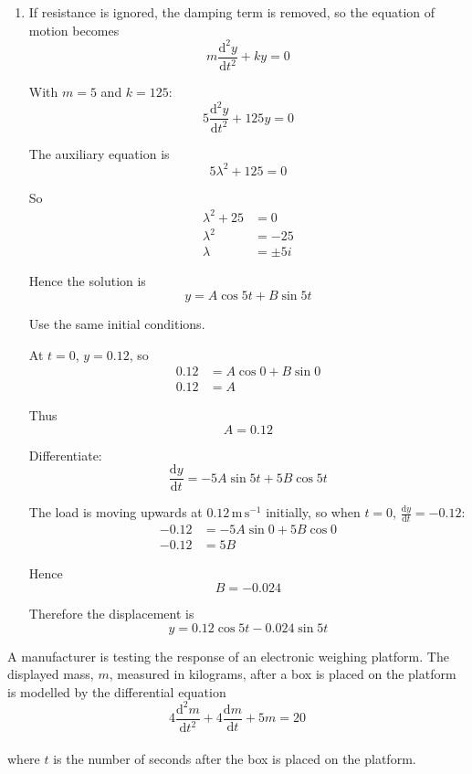 \documentclass[leqno]{article}
\begin{document}
\begin{enumerate}[
  label=\textbf{\arabic*.},
  leftmargin=*,
  topsep=0pt,
  partopsep=0pt,
  parsep=0pt
]
\begin{djsSolution}
\begin{enumerate}[label=\textbf{(\alph*)}]
  \item If resistance is ignored, the damping term is removed, so the equation of motion becomes
  \[
  m\frac{\mathrm{d}^2y}{\mathrm{d}t^2}+ky=0
  \]

  With $m=5$ and $k=125$:
  \[
  5\frac{\mathrm{d}^2y}{\mathrm{d}t^2}+125y=0
  \]

  The auxiliary equation is
  \[
  5\lambda^2+125=0
  \]

  So
  \begin{align*}
  \lambda^2+25&=0 \\
  \lambda^2&=-25 \\
  \lambda&=\pm 5i
  \end{align*}

  Hence the solution is
  \[
  y=A\cos 5t+B\sin 5t
  \]

  Use the same initial conditions.

  At $t=0$, $y=0.12$, so
  \begin{align*}
  0.12&=A\cos 0+B\sin 0 \\
  0.12&=A
  \end{align*}

  Thus
  \[
  A=0.12
  \]

  Differentiate:
  \[
  \frac{\mathrm{d}y}{\mathrm{d}t}=-5A\sin 5t+5B\cos 5t
  \]

  The load is moving upwards at $0.12\,\mathrm{m\,s^{-1}}$ initially, so when $t=0$, $\frac{\mathrm{d}y}{\mathrm{d}t}=-0.12$:
  \begin{align*}
  -0.12&=-5A\sin 0+5B\cos 0 \\
  -0.12&=5B
  \end{align*}

  Hence
  \[
  B=-0.024
  \]

  Therefore the displacement is
  \[
  y=0.12\cos 5t-0.024\sin 5t
  \]
\end{enumerate}
\end{djsSolution}


\newpage

\questionitem

A manufacturer is testing the response of an electronic weighing platform. The displayed mass, $m$, measured in kilograms, after a box is placed on the platform is modelled by the differential equation \\
\[4\frac{\mathrm{d}^2 m}{\mathrm{d} t^2}+4\frac{\mathrm{d} m}{\mathrm{d} t}+5m=20\] \\
where $t$ is the number of seconds after the box is placed on the platform. \\


\end{enumerate}
\end{document}
